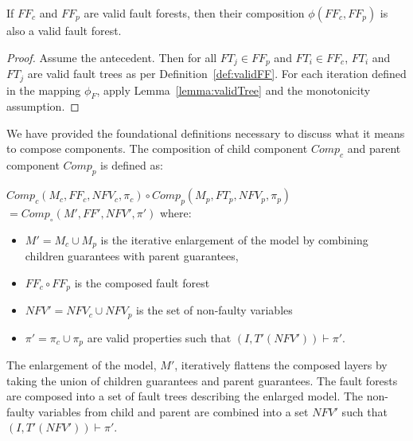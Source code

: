 \begin{lemma} If $\mathit{FF_c}$ and $\mathit{FF_p}$ are valid fault forests, then their composition $\phi(\mathit{FF_c}, \mathit{FF_p})$ is also a valid fault forest. 
\begin{proof}

Assume the antecedent. Then for all $\mathit{FT_j} \in \mathit{FF_p}$ and $\mathit{FT_i} \in \mathit{FF_c}$, $\mathit{FT_i}$ and $\mathit{FT_j}$ are valid fault trees as per Definition~\ref{def:validFF}. For each iteration defined in the mapping $\phi_F$, apply Lemma~\ref{lemma:validTree} and the monotonicity assumption. 

\end{proof}
\label{lemma:validForest}
\end{lemma}











We have provided the foundational definitions necessary to discuss what it means to compose components. The composition of child component $\mathit{Comp}_c$ and parent component $\mathit{Comp}_p$ is defined as:

\begin{definition}
$Comp_c(M_c, \mathit{FF}_c, \mathit{NFV}_c, \pi_c) \circ Comp_p(M_p, \mathit{FT}_p, \mathit{NFV}_p, \pi_p) $\\$= Comp_\circ(M', \mathit{FF}', \mathit{NFV}', \pi')$ where:
\begin{itemize}[label=\textbullet]
\item $M' = M_c \cup M_p$ is the iterative enlargement of the model by combining children guarantees with parent guarantees,
\item $\mathit{FF}_c \circ \mathit{FF}_p$ is the composed fault forest
\item $\mathit{NFV}' = \mathit{NFV}_c \cup \mathit{NFV}_p$ is the set of non-faulty variables
\item $\pi' = \pi_c \cup \pi_p$ are valid properties such that $(I, T'(\mathit{NFV}')) \vdash \pi'$.
\end{itemize}
\end{definition}

The enlargement of the model, $M'$, iteratively flattens the composed layers by taking the union of children guarantees and parent guarantees. The fault forests are composed into a set of fault trees describing the enlarged model. The non-faulty variables from child and parent are combined into a set $\mathit{NFV'}$ such that $(I, T'(\mathit{NFV}')) \vdash \pi'$. 


